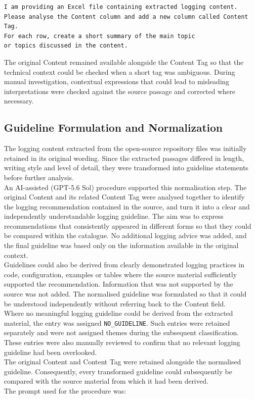 \begin{listing}[H]
\begin{verbatim}
I am providing an Excel file containing extracted logging content.
Please analyse the Content column and add a new column called Content Tag.
For each row, create a short summary of the main topic
or topics discussed in the content.
\end{verbatim}
\caption{Prompt for contextual content tagging}
\label{lst:prompt_content_tagging}
\end{listing}

The original Content remained available alongside the Content Tag so that the technical
context could be checked when a short tag was ambiguous. During manual investigation,
contextual expressions that could lead to misleading interpretations were checked
against the source passage and corrected where necessary.

\subsection{Guideline Formulation and Normalization}

The logging content extracted from the open-source repository files was initially
retained in its original wording. Since the extracted passages differed in length,
writing style and level of detail, they were transformed into guideline statements
before further analysis.
\\
An AI-assisted (GPT-5.6 Sol) procedure supported this normalisation step.
The original Content and its related Content Tag were analysed together to identify
the logging recommendation contained in the source, and turn it into a clear and
independently understandable logging guideline. The aim was to express recommendations
that consistently appeared in different forms so that they could be compared
within the catalogue. No additional logging advice was added, and the final guideline
was based only on the information available in the original context.
\\
Guidelines could also be derived from clearly demonstrated logging practices in code,
configuration, examples or tables where the source material sufficiently supported the recommendation. Information that was not supported by the source was not added.
The normalised guideline was formulated so that it could be understood independently
without referring back to the Content field.
\\
Where no meaningful logging guideline could be derived from the extracted material,
the entry was assigned \texttt{NO\_GUIDELINE}. Such entries were retained separately
and were not assigned themes during the subsequent classification.
These entries were also manually reviewed to confirm that no relevant
logging guideline had been overlooked.
\\
The original Content and Content Tag were retained alongside the normalised guideline.
Consequently, every transformed guideline could subsequently be compared with the
source material from which it had been derived.
\\
The prompt used for the procedure was:

